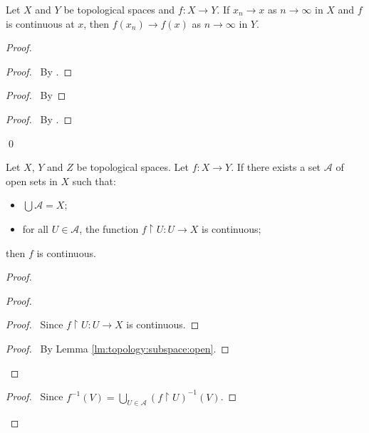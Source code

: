 \begin{thm}
  Let $X$ and $Y$ be topological spaces and $f : X \rightarrow Y$.
  If $x_n \rightarrow x$ as $n \rightarrow \infty$ in $X$ and $f$ is
  continuous
  at $x$, then $f(x_n)
  \rightarrow f(x)$ as $n \rightarrow \infty$ in $Y$.
\end{thm}

\begin{proof}
  \pf
  \begin{proof}
    \pf\ By .
  \end{proof}
  \begin{proof}
    \pf\ By 
  \end{proof}
  \begin{proof}
    \pf\ By .
  \end{proof}
  \qed
\end{proof}

\begin{thm}
  \label{thm:topology:continuous:local}
  Let $X$, $Y$ and $Z$ be topological spaces.
  Let $f : X \rightarrow Y$. If there exists a set $\mathcal{A}$ of open
  sets in
  $X$ such that:
  \begin{itemize}
    \item $\bigcup \mathcal{A} = X$;
    \item for all $U \in \mathcal{A}$, the function $f \restriction U : U
    \rightarrow X$ is continuous;
  \end{itemize}
  then $f$ is continuous.
\end{thm}

\begin{proof}
  \pf
  \begin{proof}
    \begin{proof}
      \pf\ Since $f \restriction U : U \rightarrow X$ is continuous.
    \end{proof}
    \qedstep
    \begin{proof}
      \pf\ By Lemma \ref{lm:topology:subspace:open}.
    \end{proof}
  \end{proof}
  \qedstep
  \begin{proof}
    \pf\ Since $f^{-1}(V) = \bigcup_{U \in \mathcal{A}} (f \restriction
    U)^{-1}(V)$.
  \end{proof}
\end{proof}

